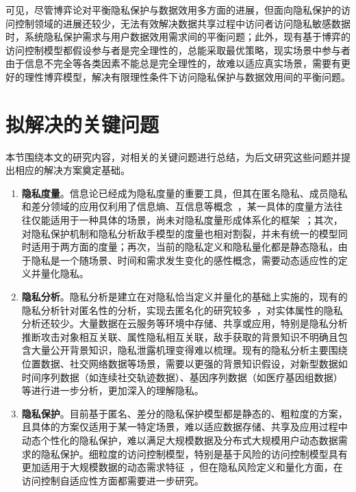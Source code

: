 可见，尽管博弈论对平衡隐私保护与数据效用多方面的进展，但面向隐私保护的访问控制领域的进展还较少，无法有效解决数据共享过程中访问者访问隐私敏感数据时，系统隐私保护需求与用户数据效用需求间的平衡问题；此外，现有基于博弈的访问控制模型都假设参与者是完全理性的，总能采取最优策略，现实场景中参与者由于信息不完全等各类因素不能总是完全理性的，故难以适应真实场景，需要有更好的理性博弈模型，解决有限理性条件下访问隐私保护与数据效用间的平衡问题。

\section{拟解决的关键问题}

本节围绕本文的研究内容，对相关的关键问题进行总结，为后文研究这些问题并提出相应的解决方案奠定基础。

\begin{enumerate}
	\item \textbf{隐私度量}。信息论已经成为隐私度量的重要工具，但其在匿名隐私、成员隐私和差分领域的应用仅利用了信息熵、互信息等概念~\cite{wagner2018technical}，某一具体的度量方法往往仅能适用于一种具体的场景，尚未对隐私度量形成体系化的框架~\cite{shokri2011quantifying,manousakas2018quantifying}；其次，对隐私保护机制和隐私分析敌手模型的度量也相对割裂，并未有统一的模型同时适用于两方面的度量；再次，当前的隐私定义和隐私量化都是静态隐私，由于隐私是一个随场景、时间和需求发生变化的感性概念，需要动态适应性的定义并量化隐私。
	
	
	\item \textbf{隐私分析}。隐私分析是建立在对隐私恰当定义并量化的基础上实施的，现有的隐私分析针对匿名性的分析，实现去匿名化的研究较多~\cite{lin2009lbs,manousakas2018quantifying}，对实体属性的隐私分析还较少。大量数据在云服务等环境中存储、共享或应用，特别是隐私分析推断攻击对象相互关联、属性隐私相互关联，敌手获取的背景知识不明确且包含大量公开背景知识，隐私泄露机理变得难以梳理。现有的隐私分析主要围绕位置数据、社交网络数据等场景，需要以更强的背景知识假设，对新型数据如时间序列数据（如连续社交轨迹数据）、基因序列数据（如医疗基因组数据）等进行进一步分析，更加深入的理解隐私。
	
	\item  \textbf{隐私保护}。目前基于匿名、差分的隐私保护模型都是静态的、粗粒度的方案，且具体的方案仅适用于某一特定场景，难以适应数据存储、共享及应用过程中动态个性化的隐私保护，难以满足大规模数据及分布式大规模用户动态数据需求的隐私保护。细粒度的访问控制模型，特别是基于风险的访问控制模型具有更加适用于大规模数据的动态需求特征~\cite{li2017access}，但在隐私风险定义和量化方面，在访问控制自适应性方面都需要进一步研究。
	

\end{enumerate}
